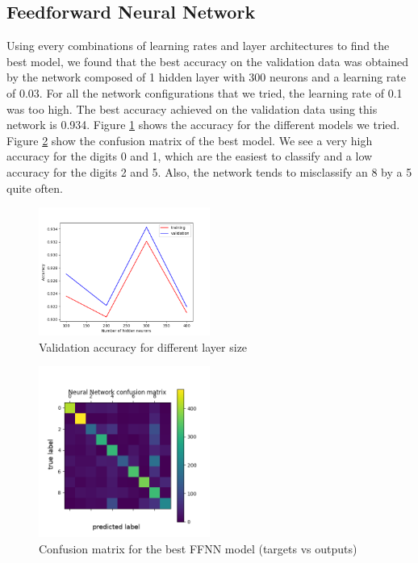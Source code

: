 \documentclass[letterpaper, 10 pt, conference]{ieeeconf}  %
\begin{document}
\subsection{Feedforward Neural Network}
Using every combinations of learning rates and layer architectures to find the best model, we found that the best accuracy on the validation data was obtained by the network composed of 1 hidden layer with 300 neurons and a learning rate of 0.03. For all the network configurations that we tried, the learning rate of 0.1 was too high. The best accuracy achieved on the validation data using this network is 0.934. Figure \ref{fig:fnntune} shows the accuracy for the different models we tried. Figure \ref{fig:fnnconf} show the confusion matrix of the best model. We see a very high accuracy for the digits 0 and 1, which are the easiest to classify and a low accuracy for the digits 2 and 5. Also, the network tends to misclassify an 8 by a 5 quite often.

\begin{figure}
	\begin{center}
			\includegraphics[width=0.5\textwidth]{figures/fnn_tune.png}  %
		\caption{Validation accuracy for different layer size}
		\label{fig:fnntune}
	\end{center}
\end{figure}
\begin{figure}
	\begin{center}
			\includegraphics[width=0.5\textwidth]{figures/fnn_conf.png}  %
		\caption{Confusion matrix for the best FFNN model (targets vs outputs)}
		\label{fig:fnnconf}
	\end{center}
\end{figure}
\end{document}
